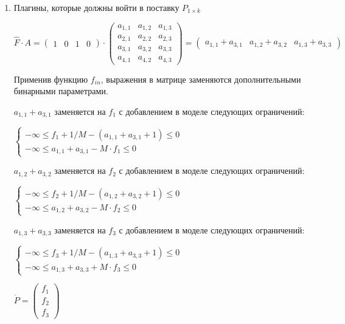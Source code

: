 \begin{enumerate}
  \item Плагины, которые должны войти в поставку $P_{1 \times k}$ 
  \begin{center}
    $
      \hat{F} \cdot A 
      = 
      \begin{pmatrix}
        1 & 0 & 1 & 0
      \end{pmatrix}
      \cdot
      \begin{pmatrix}
        a_{1, 1} & a_{1, 2} & a_{1, 3} \\
        a_{2, 1} & a_{2, 2} & a_{2, 3} \\
        a_{3, 1} & a_{3, 2} & a_{3, 3} \\
        a_{4, 1} & a_{4, 2} & a_{4, 3}
      \end{pmatrix}
      =
      \begin{pmatrix}
        a_{1, 1} + a_{3, 1} & 
        a_{1, 2} + a_{3, 2} & 
        a_{1, 3} + a_{3, 3} 
      \end{pmatrix}
    $
  \end{center}

  Применив функцию $f_{in}$, выражения в матрице заменяются дополнительными бинарными параметрами.
  
  $a_{1, 1} + a_{3, 1}$ заменяется на $f_{1}$ с добавлением в моделе следующих ограничений:
  \begin{center}
    $
      \begin{cases}
        -\infty \le f_{1} + 1 / M - (a_{1,1} + a_{3,1} + 1) \le 0 \\ %
        -\infty \le a_{1,1} + a_{3,1} - M \cdot f_{1} \le 0 %
      \end{cases}
    $
  \end{center}

  $a_{1, 2} + a_{3, 2}$ заменяется на $f_{2}$ с добавлением в моделе следующих ограничений:
  \begin{center}
    $
      \begin{cases}
        -\infty \le f_{2} + 1 / M - (a_{1,2} + a_{3,2} + 1) \le 0 \\ %
        -\infty \le a_{1,2} + a_{3,2} - M \cdot f_{2} \le 0 %
      \end{cases}
    $
  \end{center}

  $a_{1, 3} + a_{3, 3}$ заменяется на $f_{3}$ с добавлением в моделе следующих ограничений:
  \begin{center}
    $
      \begin{cases}
        -\infty \le f_{3} + 1 / M - (a_{1,3} + a_{3,3} + 1) \le 0 \\ %
        -\infty \le a_{1,3} + a_{3,3} + M \cdot f_{3} \le 0 %
      \end{cases}
    $
  \end{center}
  \begin{center}
    $
      \dot{P} = \begin{pmatrix}
        f_{1} \\ 
        f_{2} \\
        f_{3} 
      \end{pmatrix}
    $
  \end{center}


\end{enumerate}
